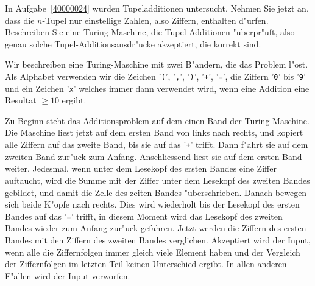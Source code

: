 In Aufgabe~\ref{40000024} wurden Tupeladditionen untersucht.
Nehmen Sie jetzt an,
dass die $n$-Tupel nur einstellige Zahlen, also Ziffern, enthalten
d"urfen. Beschreiben Sie eine Turing-Maschine, die Tupel-Additionen
"uberpr"uft, also genau solche Tupel-Additionsausdr"ucke akzeptiert,
die korrekt sind.

\begin{loesung}
Wir beschreiben eine Turing-Maschine mit zwei B"andern, die das
Problem l"ost. Als Alphabet verwenden wir die Zeichen '{\tt (}',
'{\tt ,}', '{\tt )}', '{\tt +}', '{\tt =}', die Ziffern '{\tt 0}' bis '{\tt 9}'
und ein Zeichen '{\tt x}' welches immer dann verwendet wird, wenn eine
Addition eine Resultat $\ge 10$ ergibt.

Zu Beginn steht das Additionsproblem auf dem einen Band der Turing Maschine.
Die Maschine liest jetzt auf dem ersten Band von links nach rechts,
und kopiert alle Ziffern auf das zweite Band, bis sie auf das '{\tt +}'
trifft. Dann f"ahrt sie auf dem zweiten Band zur"uck zum Anfang.
Anschliessend liest sie auf dem ersten Band weiter. Jedesmal, wenn unter
dem Lesekopf des ersten Bandes eine Ziffer auftaucht, wird die Summe mit der
Ziffer unter dem Lesekopf des zweiten Bandes gebildet, und damit die Zelle
des zeiten Bandes "uberschrieben. Danach bewegen sich beide K"opfe nach
rechts. Dies wird wiederholt bis der Lesekopf des ersten Bandes auf das
'{\tt =}' trifft, in diesem Moment wird das Lesekopf des zweiten Bandes
wieder zum Anfang zur"uck gefahren. Jetzt werden die Ziffern des ersten
Bandes mit den Ziffern des zweiten Bandes verglichen. Akzeptiert wird
der Input, wenn alle die Ziffernfolgen immer gleich viele Element haben
und der Vergleich der Ziffernfolgen im letzten Teil keinen Unterschied ergibt.
In allen anderen F"allen wird der Input verworfen.
\end{loesung}
